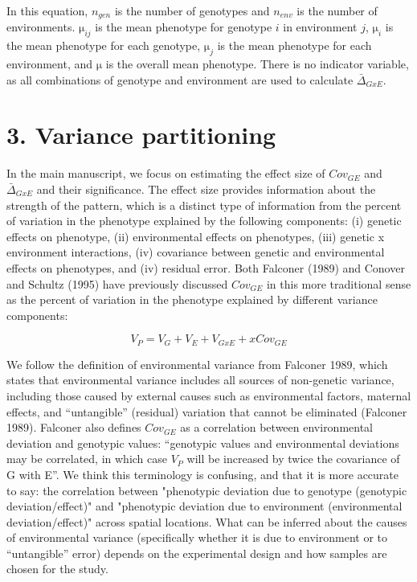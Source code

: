 \documentclass[11pt, oneside]{amsart}
\begin{document}
In this equation, $n_{gen}$ is the number of genotypes and $n_{env}$ is the number of environments. $\si\micro_{ij}$ is the mean phenotype for genotype $i$ in environment $j$, $\si\micro_{i}$ is the mean phenotype for each genotype, $\si\micro_{j}$ is the mean phenotype for each environment, and $\si\micro$ is the overall mean phenotype. There is no indicator variable, as all combinations of genotype and environment are used to calculate $ \bar\Delta_{GxE}$.

\clearpage
\newpage

\section{3. Variance partitioning}

In the main manuscript, we focus on estimating the effect size of $Cov_{GE}$ and $\bar\Delta_{GxE}$ and their significance. The effect size provides information about the strength of the pattern, which is a distinct type of information from the percent of variation in the phenotype explained by the following components: (i) genetic effects on phenotype, (ii) environmental effects on phenotypes, (iii) genetic x environment interactions, (iv) covariance between genetic and environmental effects on phenotypes, and (iv) residual error. Both Falconer (1989) and Conover and Schultz (1995) have previously discussed $Cov_{GE}$ in this more traditional sense as the percent of variation in the phenotype explained by different variance components:

\begin{equation}
V_P = V_G + V_E + V_{GxE} + xCov_{GE} 
\end{equation}

We follow the definition of environmental variance from Falconer 1989, which states that environmental variance includes all sources of non-genetic variance, including those caused by external causes such as environmental factors, maternal effects, and “untangible” (residual) variation that cannot be eliminated (Falconer 1989). Falconer also defines $Cov_{GE}$ as a correlation between environmental deviation and genotypic values: “genotypic values and environmental deviations may be correlated, in which case $V_P$ will be increased by twice the covariance of G with E”. We think this terminology is confusing, and that it is more accurate to say: the correlation between "phenotypic deviation due to genotype (genotypic deviation/effect)" and "phenotypic deviation due to environment (environmental deviation/effect)" across spatial locations. What can be inferred about the causes of environmental variance (specifically whether it is due to environment or to “untangible” error) depends on the experimental design and how samples are chosen for the study.\\
\end{document}
